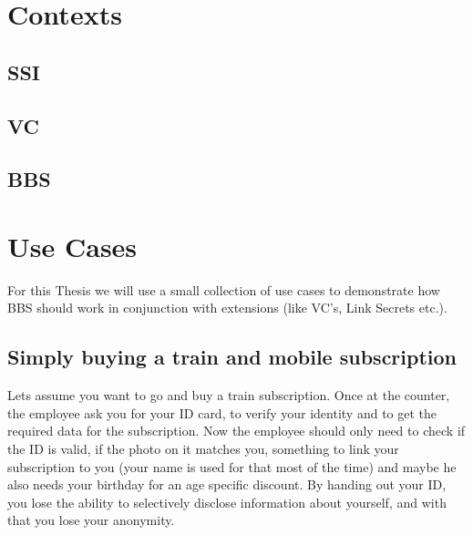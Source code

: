 \documentclass[
	a4paper               %
	,bibliography=totoc   %
	,listof=totoc         %
	,monolingual
	twoside=false,
]{bfhthesis}              %
\begin{document}

\chapter{Contexts}

\section{SSI}

\section{VC}

\section{BBS}

\chapter{Use Cases}
For this Thesis we will use a small collection of use cases to demonstrate how BBS should work in conjunction with extensions (like VC's, Link Secrets etc.).

\section{Simply buying a train and mobile subscription}
Lets assume you want to go and buy a train subscription.
Once at the counter, the employee ask you for your ID card, to verify your identity and to get the required data for the subscription.
Now the employee should only need to check if the ID is valid, if the photo on it matches you, something to link your subscription to you (your name is used for that most of the time) and maybe he also needs your birthday for an age specific discount.
By handing out your ID, you lose the ability to selectively disclose information about yourself, and with that you lose your anonymity.
\end{document}
